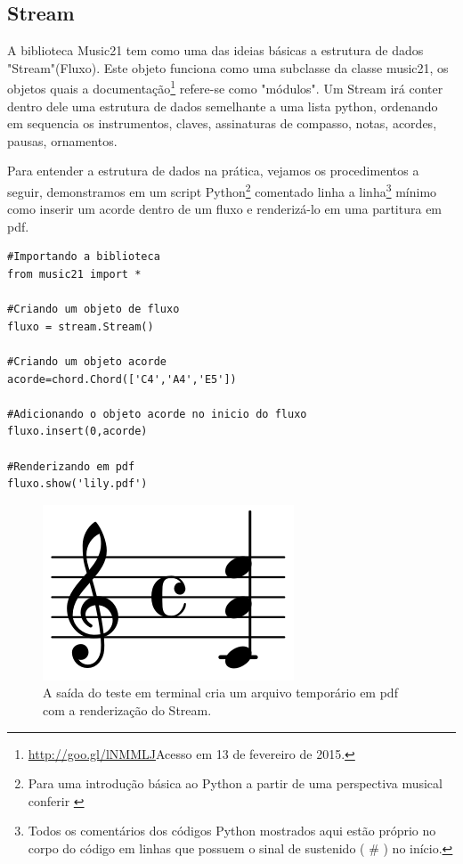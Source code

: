 \documentclass[
	12pt,				%
	openright,			%
	twoside,			%
	a4paper,			%
	english,			%
	french,				%
	spanish,			%
	brazil				%
	]{abntex2}
\begin{document}
\subsection{Stream}

A biblioteca Music21 tem como uma das ideias básicas a estrutura de dados "Stream"(Fluxo). Este objeto funciona como uma subclasse da classe music21, os objetos quais a documentação\footnote{\url{http://goo.gl/lNMMLJ}Acesso em 13 de fevereiro de 2015.} refere-se  como "módulos". Um Stream irá conter dentro dele uma estrutura de dados semelhante a uma lista python, ordenando em sequencia os instrumentos, claves, assinaturas de compasso, notas, acordes, pausas, ornamentos.

Para entender a estrutura de dados na prática, vejamos os procedimentos a seguir, demonstramos em um script Python\footnote{Para uma introdução básica ao Python a partir de uma perspectiva musical conferir \cite{Kroger201208} } comentado linha a linha\footnote{Todos os comentários dos códigos Python mostrados aqui estão próprio no corpo do código em linhas que possuem o sinal de sustenido ( \# ) no início.} mínimo como inserir um acorde dentro de um fluxo e renderizá-lo em uma partitura em pdf.

 
\begin{lstlisting}
#Importando a biblioteca
from music21 import *

#Criando um objeto de fluxo 
fluxo = stream.Stream()

#Criando um objeto acorde
acorde=chord.Chord(['C4','A4','E5'])

#Adicionando o objeto acorde no inicio do fluxo
fluxo.insert(0,acorde)

#Renderizando em pdf
fluxo.show('lily.pdf')
\end{lstlisting}
 

\begin{figure}[!h]
	\caption{\label{fig_grafico} A saída do teste em terminal cria um arquivo temporário em pdf com a renderização do Stream.}
	\begin{center}
	    \includegraphics[scale=0.3]{estudosM21/acorde01.png}
	\end{center}
\end{figure}
\end{document}
